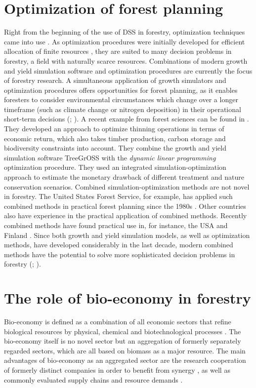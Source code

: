 \section{Optimization of forest planning}
\label{sec:intro:opt}
Right from the beginning of the use of DSS in forestry, optimization techniques came into use \citep[p. 16]{kangas_2015}. As optimization procedures were initially developed for efficient allocation of finite resources \citep[p. 271]{davis_2001}, they are suited to many decision problems in forestry, a field with naturally scarce resources. Combinations of modern growth and yield simulation software and optimization procedures are currently the focus of forestry research. A simultaneous application of growth simulators and optimization procedures offers opportunities for forest planning, as it enables foresters to consider environmental circumstances which change over a longer timeframe (such as climate change or nitrogen deposition) in their operational short-term decisions (\citealp[p. 346-347]{mohring_2010}; \citealp[p. 1081]{pretzsch_2008}). A recent example from forest sciences can be found in \citet{yousefpour_2009}. They developed an approach to optimize thinning operations in terms of economic return, which also takes timber production, carbon storage and biodiversity constraints into account. They combine the growth and yield simulation software TreeGrOSS with the \textit{dynamic linear programming} optimization procedure. They used an integrated simulation-optimization approach to estimate the monetary drawback of different treatment and nature conservation scenarios. Combined simulation-optimization methods are not novel in forestry. The United States Forest Service, for example, has applied such combined methods in practical forest planning since the 1980s \citep[p. 33]{hoganson_2015}. Other countries also have experience in the practical application of combined methods. Recently combined methods have found practical use in, for instance, the USA and Finland \citep[p. 41]{hoganson_2015}. Since both growth and yield simulation models, as well as optimization methods, have developed considerably in the last decade, modern combined methods have the potential to solve more sophisticated decision problems in forestry (\citealp[p. 16-17]{kangas_2015}; \citealp[p. 93]{muys_2010}).

\section{The role of bio-economy in forestry}
\label{sec:intro:biecon}
Bio-economy is defined as a combination of all economic sectors that refine biological resources by physical, chemical and biotechnological processes \citep[p. 10462]{debesi_2015}. The bio-economy itself is no novel sector but an aggregation of formerly separately regarded sectors, which are all based on biomass as a major resource. The main advantages of bio-economy as an aggregated sector are the research cooperation of formerly distinct companies in order to benefit from synergy \citep[p. 1]{auer_2016}, as well as commonly evaluated supply chains and resource demands \citep[p. 3]{geldermann_2016}.

